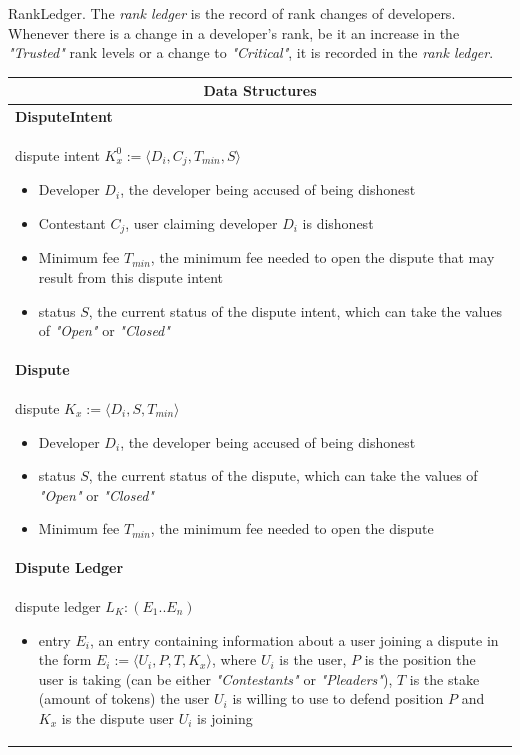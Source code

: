 \noindent \textsf{RankLedger}. The \textit{rank ledger} is the record of rank changes of developers. Whenever there is a change in a developer's rank, be it an increase in the \textit{"Trusted"} rank levels or a change to \textit{"Critical"}, it is recorded in the \textit{rank ledger}.

\begin{table}[H]
\footnotesize
\centering
\begin{tabular}{|p{}|}
\hline
\multicolumn{1}{|c|}{Data Structures} \\
\hline \vspace{0.05cm}
\textbf{DisputeIntent} \\
dispute intent $K^{0}_{x} := \langle D_i, C_j, T_{min}, S\rangle$
\begin{itemize}
	\item Developer $D_i$, the developer being accused of being dishonest
	\item Contestant $C_j$, user claiming developer $D_i$ is dishonest
	\item Minimum fee $T_{min}$, the minimum fee needed to open the dispute that may result from this dispute intent
	\item status $S$, the current status of the dispute intent, which can take the values of \textit{"Open"} or \textit{"Closed"}
\end{itemize} \\
\textbf{Dispute} \\
dispute $K_x := \langle D_i, S, T_{min}\rangle$
\begin{itemize}
	\item Developer $D_i$, the developer being accused of being dishonest
	\item status $S$, the current status of the dispute, which can take the values of \textit{"Open"} or \textit{"Closed"}
	\item Minimum fee $T_{min}$, the minimum fee needed to open the dispute
\end{itemize} \\
\textbf{Dispute Ledger} \\
dispute ledger $L_{K} : (E_1..E_n)$
\begin{itemize}
	\item entry $E_i$, an entry containing information about a user joining a dispute in the form $E_i := \langle U_i, P, T, K_x\rangle$, where $U_i$ is the user, $P$ is the position the user is taking (can be either \textit{"Contestants"} or \textit{"Pleaders"}), $T$ is the stake (amount of tokens) the user $U_i$ is willing to use to defend position $P$ and $K_x$ is the dispute user $U_i$ is joining

\end{itemize}
\end{tabular}
\end{table}

